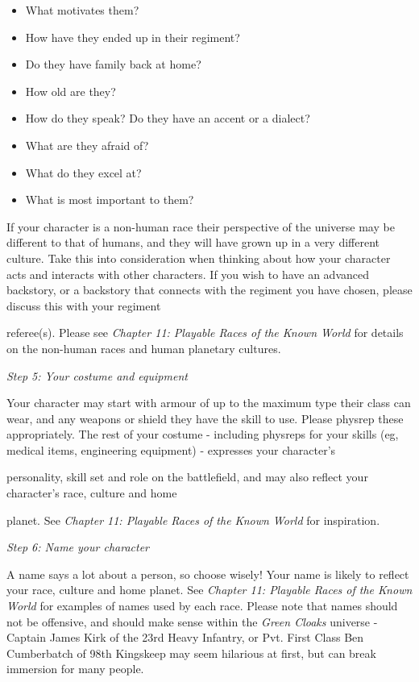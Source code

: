 \documentclass{scrbook}
\begin{document}
\begin{itemize}
\item What motivates them?

\item How have they ended up in their regiment?

\item Do they have family back at home?

\item How old are they?

\item How do they speak? Do they have an accent or a dialect?

\item What are they afraid of?

\item What do they excel at?

\item What is most important to them?

\end{itemize}
If your character is a non-human race their perspective of the universe may be different to that of humans, and they will have grown up in a very different culture. Take this into consideration when thinking about how your character acts and interacts with other characters. If you wish to have an advanced backstory, or a backstory that connects with the regiment you have chosen, please discuss this with your regiment

referee(s). Please see \textit{Chapter 11: Playable Races of the Known World} for details on the non-human races and human planetary cultures.

\textit{Step 5: Your costume and equipment}

Your character may start with armour of up to the maximum type their class can wear, and any weapons or shield they have the skill to use. Please physrep these appropriately. The rest of your costume - including physreps for your skills (eg, medical items, engineering equipment) - expresses your character's

personality, skill set and role on the battlefield, and may also reflect your character's race, culture and home

planet. See \textit{Chapter 11: Playable Races of the Known World} for inspiration.

\textit{Step 6: Name your character}

A name says a lot about a person, so choose wisely! Your name is likely to reflect your race, culture and home planet. See \textit{Chapter 11: Playable Races of the Known World} for examples of names used by each race. Please note that names should not be offensive, and should make sense within the \textit{Green Cloaks} universe - Captain James Kirk of the 23rd Heavy Infantry, or Pvt. First Class Ben Cumberbatch of 98th Kingskeep may seem hilarious at first, but can break immersion for many people.
\end{document}
